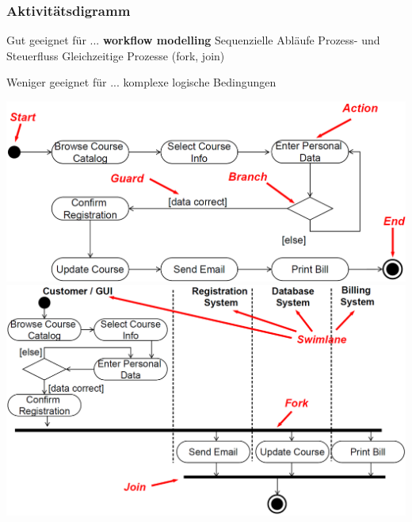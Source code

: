 \subsubsection{Aktivitätsdigramm}

\begin{minipage}[t]{0.48\columnwidth}
    \begin{outline}
        \1 Gut geeignet für ...
            \2 \textbf{workflow modelling}
            \2 Sequenzielle Abläufe
            \2 Prozess- und Steuerfluss
            \2 Gleichzeitige Prozesse (fork, join)
    \end{outline}
\end{minipage}
\hfill
\begin{minipage}[t]{0.48\columnwidth}
    \begin{outline}
        \1 Weniger geeignet für ...
            \2 komplexe logische Bedingungen
    \end{outline}
\end{minipage}


\begin{center}
    \includegraphics[width=0.8\columnwidth]{images/aktivitaetsdiagramm_elemente.png}
    \includegraphics[width=0.8\columnwidth]{images/aktivitaetsdiagramm_parallelitaet.png}
\end{center}




